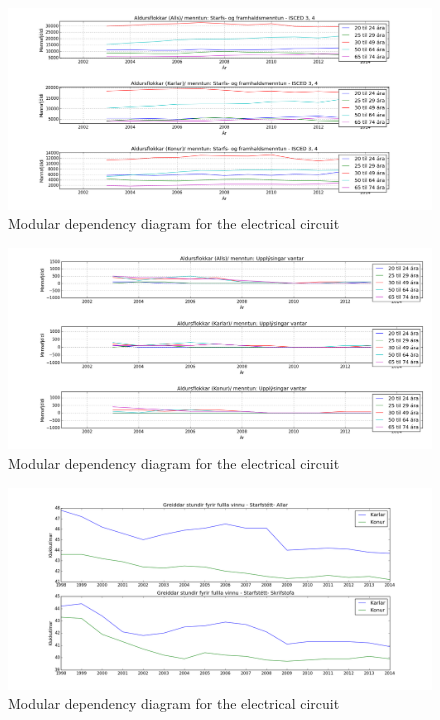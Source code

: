 \documentclass[12pt, svn, draft]{rureport}
\begin{document}
\begin{figure}
	\centering 
	\includegraphics[scale=0.7]{../graphics/mentun_aldrusflokkar_starfs_og_framhaldsmenntun.png}
	\caption{Modular dependency diagram for the electrical circuit \label{fig:menntunfram}}
\end{figure}

\begin{figure}
	\centering 
	\includegraphics[scale=0.7]{../graphics/mentun_aldrusflokkar_upplysingar_vantar.png}
	\caption{Modular dependency diagram for the electrical circuit \label{fig:menntunvantar}}
\end{figure}

\begin{figure}
	\centering 
	\includegraphics[scale=0.7]{../graphics/unnir_timar1.png}
	\caption{Modular dependency diagram for the electrical circuit \label{fig:unnirtimar1}}
\end{figure}
\end{document}
